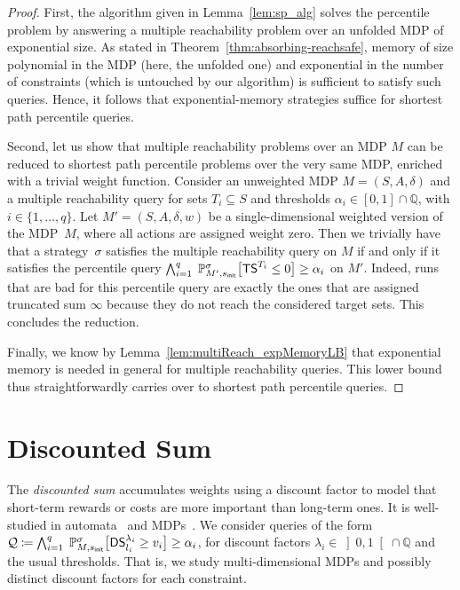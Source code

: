 \documentclass{llncs}
\newcommand{\states}{\ensuremath{S} }
\newcommand{\initState}{\ensuremath{s_{{\sf init}}} }
\newcommand{\weight}{\ensuremath{w} }
\newcommand{\markovProcess}{\ensuremath{{M} }}
\newcommand{\strat}{\ensuremath{\sigma} }
\newcommand*{\pr}{\mathbb{P}}
\newcommand{\truncatedTarget}{\ensuremath{T} }
\newcommand{\truncatedSum}[1]{\ensuremath{{\sf TS}^{#1}} }
\newcommand{\discSum}[1]{\ensuremath{{\sf DS}^{#1}} }
\newcommand{\discount}{\ensuremath{\lambda} }
\newcommand{\queries}{\ensuremath{q} }
\newcommand{\rat}{\ensuremath{\mathbb{Q}} }
\newcommand{\query}{\ensuremath{\mathcal{Q}} }
\begin{document}
\begin{proof}
First, the algorithm given in Lemma~\ref{lem:sp_alg} solves the percentile problem by answering a multiple reachability problem over an unfolded MDP of exponential size. As stated in Theorem~\ref{thm:absorbing-reachsafe}, memory of size polynomial in the MDP (here, the unfolded one) and exponential in the number of constraints (which is untouched by our algorithm) is sufficient to satisfy such queries. Hence, it follows that exponential-memory strategies suffice for shortest path percentile queries.

Second, let us show that multiple reachability problems over an MDP $M$ can be reduced to shortest path percentile problems over the very same MDP, enriched with a trivial weight function. Consider an unweighted MDP $\markovProcess = (\states, A, \delta)$ and a multiple reachability query for sets $T_{i} \subseteq \states$ and thresholds $\alpha_{i} \in \left[ 0, 1\right] \cap \rat$, with $i \in \{1, \ldots{}, \queries\}$. Let $\markovProcess' = (\states, A, \delta, \weight)$ be a single-dimensional weighted version of the MDP~$\markovProcess$, where all actions are assigned weight zero. Then we trivially have that a strategy~$\strat$ satisfies the multiple reachability query on $\markovProcess$ if and only if it satisfies the percentile query $\bigwedge_{i = 1}^{q}\; \pr_{M',\initState}^\strat\big[\truncatedSum{\truncatedTarget_{i}} \leq 0\big] \geq	\alpha_i$ on $\markovProcess'$. Indeed, runs that are bad for this percentile query are exactly the ones that are assigned truncated sum $\infty$ because they do not reach the considered target sets. This concludes the reduction.

Finally, we know by Lemma~\ref{lem:multiReach_expMemoryLB} that exponential memory is needed in general for multiple reachability queries. This lower bound thus straightforwardly carries over to shortest path percentile queries.
\end{proof} 
\section{Discounted Sum}
\label{sec:ds}

The \textit{discounted sum} accumulates weights using a discount factor to model that short-term rewards or costs are more important than long-term ones. It is well-studied in automata~\cite{DBLP:journals/corr/BokerH14} and MDPs~\cite{Puterman-wiley94,CMH-stacs06,DBLP:conf/lpar/ChatterjeeFW13}. We consider queries of the form $\query \coloneqq \bigwedge_{i = 1}^{q}\; \pr_{M,\initState}^\strat\big[\discSum{\discount_{i}}_{l_{i}} \geq v_i\big] \geq
	\alpha_i$, for discount factors $\discount_{i} \in \left] 0, 1\right[ \cap \rat$ and the usual thresholds. That is, we study multi-dimensional MDPs and possibly distinct discount factors for each constraint.
	
\end{document}
